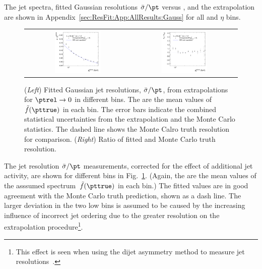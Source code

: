 The jet \pt spectra, fitted Gaussian resolutions $\bar{\sigma}/\pt$ versus \ptrel, and the extrapolation are shown in Appendix~\ref{sec:ResFit:App:AllResults:Gauss} for all \pt and $\eta$ bins.

\begin{figure}[ht]
  \centering
  \begin{tabular}{cc}
    \includegraphics[width=0.45\textwidth]{figures/ResFit_Spring10QCDFlat_Gauss_Eta0_ExtrapolatedResolution} &
    \includegraphics[width=0.45\textwidth]{figures/ResFit_Spring10QCDFlat_Gauss_Eta0_ExtrapolatedResolutionRatio}
  \end{tabular}
\caption{(\textit{Left}) Fitted Gaussian jet \pt resolutions, $\bar{\sigma}/\pt$, from extrapolations for \mbox{$\ptrel\rightarrow0$} in different \pt bins.
  The \pt are the mean values of $\tilde{f}(\pttrue)$ in each bin.
  The error bars indicate the combined statistical uncertainties from the extrapolation and the Monte Carlo statistics.
  The dashed line shows the Monte Calro truth resolution for comparison.
  (\textit{Right}) Ratio of fitted and Monte Carlo truth resolution.}
\label{fig:ResFit:QCDMC:Extrapolation:Gauss:ResoVsPt}
\end{figure}

The jet \pt resolution $\bar{\sigma}/\pt$ measurements, corrected for the effect of additional jet activity, are shown for different \pt bins in Fig.~\ref{fig:ResFit:QCDMC:Extrapolation:Gauss:ResoVsPt}.
(Again, the \pt are the mean values of the asssumed spectrum~$\tilde{f}(\pttrue)$ in each bin.)
The fitted values are in good agreement with the Monte Carlo truth prediction, shown as a dash line.
The larger deviation in the two low \pt bins is assumed to be caused by the increasing influence of incorrect jet ordering due to the greater resolution on the extrapolation procedure\footnote{This effect is seen when using the dijet asymmetry method to measure jet \pt resolutions~\cite{bib:cmspas:dijetasymm}.}.

